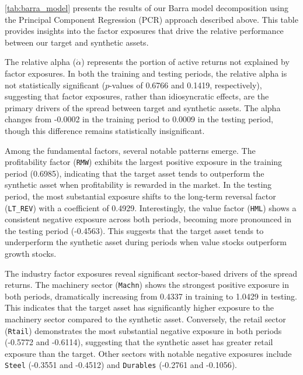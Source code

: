 



\cref{tab:barra_model} presents the results of our Barra model decomposition using the Principal Component Regression (PCR) approach described above. This table provides insights into the factor exposures that drive the relative performance between our target and synthetic assets.

The relative alpha ($\dot \alpha$) represents the portion of active returns not explained by factor exposures. In both the training and testing periods, the relative alpha is not statistically significant ($p$-values of 0.6766 and 0.1419, respectively), suggesting that factor exposures, rather than idiosyncratic effects, are the primary drivers of the spread between target and synthetic assets. The alpha changes from -0.0002 in the training period to 0.0009 in the testing period, though this difference remains statistically insignificant.

Among the fundamental factors, several notable patterns emerge. The profitability factor (\texttt{RMW}) exhibits the largest positive exposure in the training period (0.6985), indicating that the target asset tends to outperform the synthetic asset when profitability is rewarded in the market. In the testing period, the most substantial exposure shifts to the long-term reversal factor (\texttt{LT\_REV}) with a coefficient of 0.4929. Interestingly, the value factor (\texttt{HML}) shows a consistent negative exposure across both periods, becoming more pronounced in the testing period (-0.4563). This suggests that the target asset tends to underperform the synthetic asset during periods when value stocks outperform growth stocks.

The industry factor exposures reveal significant sector-based drivers of the spread returns. The machinery sector (\texttt{Machn}) shows the strongest positive exposure in both periods, dramatically increasing from 0.4337 in training to 1.0429 in testing. This indicates that the target asset has significantly higher exposure to the machinery sector compared to the synthetic asset. Conversely, the retail sector (\texttt{Rtail}) demonstrates the most substantial negative exposure in both periods (-0.5772 and -0.6114), suggesting that the synthetic asset has greater retail exposure than the target. Other sectors with notable negative exposures include \texttt{Steel} (-0.3551 and -0.4512) and \texttt{Durables} (-0.2761 and -0.1056).

